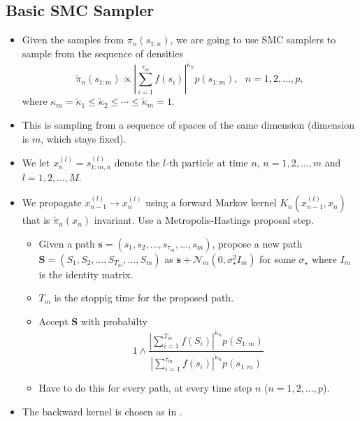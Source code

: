 \documentclass{article}
\begin{document}
\subsection{Basic SMC Sampler}

\begin{itemize}

\item Given the samples from $\pi_{n}(s_{1:n})$, we are going to use SMC samplers to sample from the sequence of densities 
$$ \tilde{\pi}_{n}(s_{1:m}) \propto \left | \sum_{i=1}^{\tau_{m}} f(s_{i}) \right |^{\tilde{\kappa}_{n}} p(s_{1:m}), \text{ } n = 1, 2, \ldots, p, $$
where $ \kappa_{m} = \tilde{\kappa}_{1} \leq \tilde{\kappa}_{2} \leq \cdots \leq \tilde{\kappa}_{m} = 1$.

\item This is sampling from a sequence of spaces of the same dimension (dimension is $m$, which stays fixed).

\item We let $x_{n}^{(l)} = s_{1:m,n}^{(l)}$ denote the $l$-th particle at time $n$, $n = 1, 2, \ldots, m$ and $l = 1, 2, \ldots, M$. 

\item We propagate $x_{n-1}^{(l)} \rightarrow x_{n}^{(l)}$ using a forward Markov kernel $K_{n} \left ( x_{n-1}^{(l)},x_{n} \right )$ that is $\tilde{\pi}_{n}(x_{n})$ invariant. Use a Metropolis-Hastings proposal step.
\begin{itemize} 
\item Given a path $\mathbf{s} = (s_{1}, s_{2}, \ldots, s_{\tau_{m}}, \ldots, s_{m} )$, propose a new path $\mathbf{S} = (S_{1}, S_{2}, \ldots, S_{T_{m}}, \ldots, S_{m})$ as $\mathbf{s} + \mathcal{N}_{m}(0,\sigma_{\star}^{2} I_{m})$ for some $\sigma_{\star}$ where $I_{m}$ is the identity matrix.
\item $T_{m}$ is the stoppig time for the proposed path.
\item Accept $\mathbf{S}$ with probabilty 
$$ 1 \wedge \frac{|\sum_{i=1}^{T_{m}}f(S_{i})|^{\tilde{\kappa}_{n}} p(S_{1:m})}{ |\sum_{i=1}^{\tau_{m}}f(s_{i})|^{\tilde{\kappa}_{n}} p(s_{1:m}) } $$
\item Have to do this for every path, at every time step $n$ ($n = 1, 2, \ldots, p$).
\end{itemize} 

\item The backward kernel is chosen as in \cite{SMC_option_jasra}.


\end{itemize}
\end{document}
